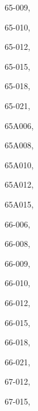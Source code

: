 \documentclass[11pt]{book}
\begin{document}
\begin{theindex}
 \item 65-009, \hyperref[p65-009]{\pageref{p65-009}}
 \item 65-010, \hyperref[p65-010]{\pageref{p65-010}}
 \item 65-012, \hyperref[p65-012]{\pageref{p65-012}}
 \item 65-015, \hyperref[p65-015]{\pageref{p65-015}}
 \item 65-018, \hyperref[p65-018]{\pageref{p65-018}}
 \item 65-021, \hyperref[p65-021]{\pageref{p65-021}}
 \item 65A006, \hyperref[p65A006]{\pageref{p65A006}}
 \item 65A008, \hyperref[p65A008]{\pageref{p65A008}}
 \item 65A010, \hyperref[p65A010]{\pageref{p65A010}}
 \item 65A012, \hyperref[p65A012]{\pageref{p65A012}}
 \item 65A015, \hyperref[p65A015]{\pageref{p65A015}}
 \item 66-006, \hyperref[p66-006]{\pageref{p66-006}}
 \item 66-008, \hyperref[p66-008]{\pageref{p66-008}}
 \item 66-009, \hyperref[p66-009]{\pageref{p66-009}}
 \item 66-010, \hyperref[p66-010]{\pageref{p66-010}}
 \item 66-012, \hyperref[p66-012]{\pageref{p66-012}}
 \item 66-015, \hyperref[p66-015]{\pageref{p66-015}}
 \item 66-018, \hyperref[p66-018]{\pageref{p66-018}}
 \item 66-021, \hyperref[p66-021]{\pageref{p66-021}}
 \item 67-012, \hyperref[p67-012]{\pageref{p67-012}}
 \item 67-015, \hyperref[p67-015]{\pageref{p67-015}}


\end{theindex}
\end{document}
